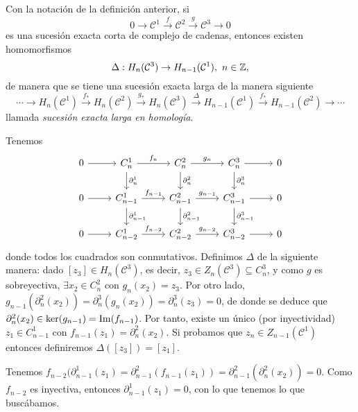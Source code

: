 \documentclass[HS.tex]{subfiles}
\begin{document}
\begin{prop}
Con la notación de la definición anterior, si 
\[
0\to \mathcal{C}^1\overset{f}{\to}\mathcal{C}^2\overset{g}{\to}\mathcal{C}^3\to 0
\]
es una sucesión exacta corta de complejo de cadenas, entonces existen homomorfismos
\[
\Delta:H_n(\mathcal{C}^3)\to H_{n-1}(\mathcal{C}^1),\ n\in\mathbb{Z},
\]
de manera que se tiene una sucesión exacta larga de la manera siguiente
\[
\cdots\to H_n(\mathcal{C}^1)\overset{f_*}{\to}H_n(\mathcal{C}^2)\overset{g_*}{\to}H_n(\mathcal{C}^3)\overset{\Delta}{\to}H_{n-1}(\mathcal{C}^1)\overset{f_*}{\to}H_{n-1}(\mathcal{C}^2)\to\cdots
\]
llamada \emph{sucesión exacta larga en homología}.
\end{prop}

\begin{dem}
Tenemos
\[\begin{tikzcd}
0\arrow[r] & C_{n}^1\arrow[r, "f_{n}"]\arrow[d, "\partial_{n}^1"]& C_n^2\arrow[r, "g_{n}"]\arrow[d,"\partial_{n}^2"]& C_{n}^3\arrow[r]\arrow[d,"\partial_{n}^3"] & 0\\
0\arrow[r] & C_{n-1}^1\arrow[r, "f_{n-1}"]\arrow[d, "\partial_{n-1}^1"]& C_{n-1}^2\arrow[r, "g_{n-1}"] \arrow[d,"\partial_{n-1}^2"]& C_{n-1}^3\arrow[r]\arrow[d,"\partial_{n-1}^3"]&  0\\
0\arrow[r] & C_{n-2}^1\arrow[r, "f_{n-2}"]& C_{n-2}^2\arrow[r, "g_{n-2}"]& C_{n-2}^3\arrow[r] & 0
\end{tikzcd}
\]
donde todos los cuadrados son conmutativos. Definimos $\Delta$ de la siguiente manera: dado $[z_3]\in H_n(\mathcal{C}^3)$, es decir, $z_3\in Z_n(\mathcal{C}^3)\subseteq C_n^3$, y como $g$ es sobreyectiva, $\exists x_2\in C_n^2$ con $g_n(x_2)=z_3$. Por otro lado, $g_{n-1}(\partial_n^2(x_2))=\partial_n^3(g_n(x_2))=\partial_n^3(z_3)=0$, de donde se deduce que $\partial_n^2(x_2)\in\ker(g_{n-1})=\operatorname{Im}(f_{n-1})$. Por tanto, existe un único (por inyectividad) $z_1\in C_{n-1}^1$ con $f_{n-1}(z_1)=\partial^2_n(x_2)$. Si probamos que $z_n\in Z_{n-1}(\mathcal{C}^1)$ entonces definiremos $\Delta([z_3])=[z_1]$.  

Tenemos $f_{n-2}(\partial^1_{n-1}(z_1)=\partial^2_{n-1}(f_{n-1}(z_1))=\partial^2_{n-1}(\partial^2_n(x_2))=0$. Como $f_{n-2}$ es inyectiva, entonces $\partial^1_{n-1}(z_1)=0$, con lo que tenemos lo que buscábamos.


\end{dem}
\end{document}
